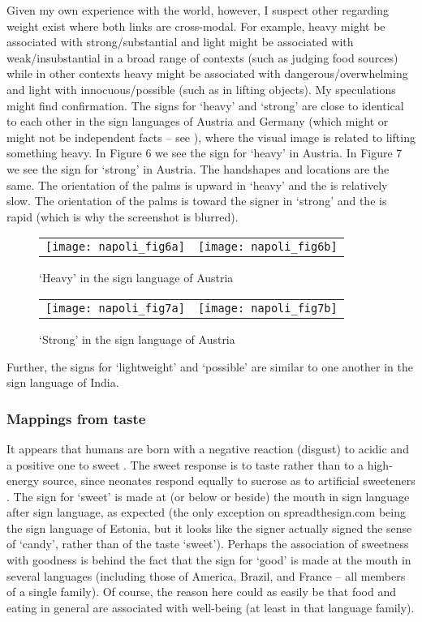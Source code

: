 \documentclass[output=paper,
modfonts
]{LSP/langsci}
\begin{document}
Given my own experience with the world, however, I suspect other
 regarding weight exist where both links are
cross-modal. For example, heavy might be associated with
strong/substantial and light might be associated with weak/insubstantial
in a broad range of contexts (such as judging food sources) while in
other contexts heavy might be associated with dangerous/overwhelming and
light with innocuous/possible (such as in lifting objects). My
speculations might find confirmation. The signs for `heavy' and `strong'
are close to identical to each other in the sign languages of Austria
and Germany (which might or might not be independent facts -- see \citealt{napolisanders}), where the visual image is related to lifting
something heavy. In Figure 6 we see the sign for `heavy' in Austria. In
Figure 7 we see the sign for `strong' in Austria. The handshapes and
locations are the same. The orientation of the palms is upward in
`heavy' and the  is relatively slow. The orientation of the
palms is toward the signer in `strong' and the  is rapid (which
is why the screenshot is blurred).

\begin{figure}
	\begin{tabularx}{\textwidth}{CC}
		\texttt{[image: napoli\_fig6a]} & \texttt{[image: napoli\_fig6b]}
	\end{tabularx}
	\caption{`Heavy' in the sign language of Austria}
	\label{fig:6n}
\end{figure}

\begin{figure}
	\begin{tabularx}{\textwidth}{CC}
		\texttt{[image: napoli\_fig7a]} & \texttt{[image: napoli\_fig7b]}
	\end{tabularx}
	\caption{`Strong' in the sign language of Austria}
	\label{fig:7n}
\end{figure}


Further, the signs for `lightweight' and `possible' are similar to one
another in the sign language of India.

\subsubsection{Mappings from taste} It appears that humans are born with a
negative reaction (disgust) to acidic and a positive one to sweet \citep{fox1986}. 
The sweet response is to taste rather than to a
high-energy source, since neonates respond equally to sucrose as to
artificial sweeteners \citep{ramenghi1996}. The sign for `sweet' is
made at (or below or beside) the mouth in sign language after sign
language, as expected (the only exception on spreadthesign.com being the
sign language of Estonia, but it looks like the signer actually signed
the sense of `candy', rather than of the taste `sweet'). Perhaps the
association of sweetness with goodness is behind the fact that the sign
for `good' is made at the mouth in several languages (including those of
America, Brazil, and France -- all members of a single family).
Of course, the reason here could as easily be that food and eating in
general are associated with well-being (at least in that language
family).
\end{document}
